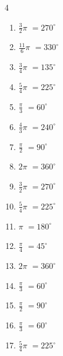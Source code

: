 \begin{multicols}{4}
\begin{enumerate}
  \item $\displaystyle \frac{3}{2}\pi$
        $\displaystyle =270^{\circ}$

  \item $\displaystyle \frac{11}{6}\pi$
        $\displaystyle =330^{\circ}$

  \item $\displaystyle \frac{3}{4}\pi$
        $\displaystyle =135^{\circ}$

  \item $\displaystyle \frac{5}{4}\pi$
        $\displaystyle =225^{\circ}$

  \item $\displaystyle \frac{\pi}{3}$
        $\displaystyle =60^{\circ}$

\columnbreak %

  \item $\displaystyle \frac{4}{3}\pi$
        $\displaystyle =240^{\circ}$

  \item $\displaystyle \frac{\pi}{2}$
        $\displaystyle =90^{\circ}$

  \item $\displaystyle 2\pi$
        $\displaystyle =360^{\circ}$

  \item $\displaystyle \frac{3}{2}\pi$
        $\displaystyle =270^{\circ}$

  \item $\displaystyle \frac{5}{4}\pi$
        $\displaystyle =225^{\circ}$

  \item $\displaystyle \pi$
        $\displaystyle =180^{\circ}$

  \item $\displaystyle \frac{\pi}{4}$
        $\displaystyle =45^{\circ}$

  \item $\displaystyle 2\pi$
        $\displaystyle =360^{\circ}$

  \item $\displaystyle \frac{\pi}{3}$
        $\displaystyle =60^{\circ}$

  \item $\displaystyle \frac{\pi}{2}$
        $\displaystyle =90^{\circ}$

  \item $\displaystyle \frac{\pi}{3}$
        $\displaystyle =60^{\circ}$

  \item $\displaystyle \frac{5}{4}\pi$
        $\displaystyle =225^{\circ}$


\end{enumerate}
\end{multicols}
